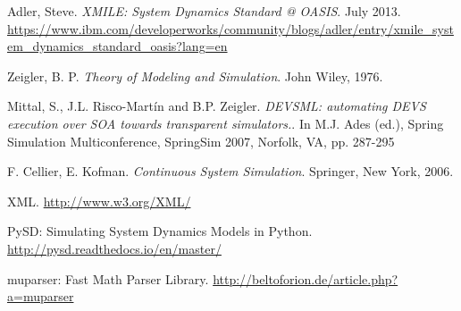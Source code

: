 \begin{thebibliography}{9}

  Adler, Steve. \textit{XMILE: System Dynamics Standard @ OASIS}. July 2013.   \url{https://www.ibm.com/developerworks/community/blogs/adler/entry/xmile_system_dynamics_standard_oasis?lang=en}

  Zeigler, B. P. \textit{Theory of Modeling and Simulation}. John Wiley, 1976.

  Mittal, S., J.L. Risco-Martín and B.P. Zeigler. \textit{DEVSML: automating DEVS execution over SOA towards transparent simulators.}. In M.J. Ades (ed.), Spring Simulation Multiconference, SpringSim 2007, Norfolk, VA, pp. 287-295

 F. Cellier, E. Kofman. \textit{Continuous System Simulation}. Springer, New York, 2006.

  XML. \url{http://www.w3.org/XML/}
 
 PySD: Simulating System Dynamics Models in Python. \url{http://pysd.readthedocs.io/en/master/}
 
 muparser: Fast Math Parser Library. \url{http://beltoforion.de/article.php?a=muparser}




\end{thebibliography}